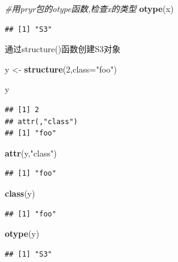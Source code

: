 \documentclass[]{book}
\newenvironment{Shaded}{\begin{snugshade}}{\end{snugshade}}
\newcommand{\KeywordTok}[1]{\textcolor[rgb]{0.13,0.29,0.53}{\textbf{#1}}}
\newcommand{\DataTypeTok}[1]{\textcolor[rgb]{0.13,0.29,0.53}{#1}}
\newcommand{\DecValTok}[1]{\textcolor[rgb]{0.00,0.00,0.81}{#1}}
\newcommand{\StringTok}[1]{\textcolor[rgb]{0.31,0.60,0.02}{#1}}
\newcommand{\CommentTok}[1]{\textcolor[rgb]{0.56,0.35,0.01}{\textit{#1}}}
\newcommand{\NormalTok}[1]{#1}
\begin{document}
\begin{Shaded}
\begin{Highlighting}[]
\CommentTok{#用pryr包的otype函数,检查x的类型}
\KeywordTok{otype}\NormalTok{(x)}
\end{Highlighting}
\end{Shaded}

\begin{verbatim}
## [1] "S3"
\end{verbatim}

通过structure()函数创建S3对象

\begin{Shaded}
\begin{Highlighting}[]
\NormalTok{y <-}\StringTok{ }\KeywordTok{structure}\NormalTok{(}\DecValTok{2}\NormalTok{,}\DataTypeTok{class=}\StringTok{"foo"}\NormalTok{)}

\NormalTok{y}
\end{Highlighting}
\end{Shaded}

\begin{verbatim}
## [1] 2
## attr(,"class")
## [1] "foo"
\end{verbatim}

\begin{Shaded}
\begin{Highlighting}[]
\KeywordTok{attr}\NormalTok{(y,}\StringTok{"class"}\NormalTok{)}
\end{Highlighting}
\end{Shaded}

\begin{verbatim}
## [1] "foo"
\end{verbatim}

\begin{Shaded}
\begin{Highlighting}[]
\KeywordTok{class}\NormalTok{(y)}
\end{Highlighting}
\end{Shaded}

\begin{verbatim}
## [1] "foo"
\end{verbatim}

\begin{Shaded}
\begin{Highlighting}[]
\KeywordTok{otype}\NormalTok{(y)}
\end{Highlighting}
\end{Shaded}

\begin{verbatim}
## [1] "S3"
\end{verbatim}
\end{document}
